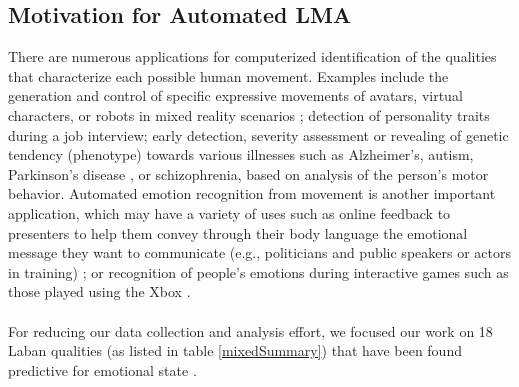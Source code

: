 \documentclass[11pt,twocolumn,varwidth=true,a4paper,fleqn]{article}
\begin{document}
\subsection{Motivation for Automated LMA}
There are numerous applications for computerized identification of the qualities that characterize each possible human movement. Examples include the generation and control of specific expressive movements 
of avatars, virtual characters, or robots in mixed reality scenarios
\cite{Masuda}; detection of personality traits during a job interview; early detection, severity assessment 
or revealing of genetic tendency (phenotype) towards various illnesses such as Alzheimer's,
autism, Parkinson's disease \cite{camurri2003application}, or schizophrenia,
based on analysis of the person's motor behavior. Automated emotion recognition from movement is another 
important application, which may have a variety of uses such as online feedback 
to presenters to help them convey through their body language the emotional message they want to communicate 
(e.g., politicians and public speakers or actors in training) \cite{nguyen2012online}; or recognition 
of people's emotions during interactive games such as those played using the Xbox \cite{Zacharatos}. 
\\\\For reducing our data collection and analysis effort, we focused our work on 18 Laban qualities (as listed in table \ref{mixedSummary}) that have been found predictive for emotional state \cite{ShafirPrivate}.
\end{document}
